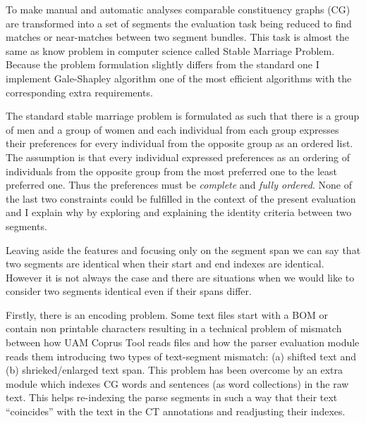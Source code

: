 To make manual and automatic analyses comparable constituency graphs (CG) are transformed into a set of segments the evaluation task being reduced to find matches or near-matches between two segment bundles. This task is almost the same as know problem in computer science called Stable Marriage Problem. Because the problem formulation slightly differs from the standard one I implement Gale-Shapley algorithm \citep{Gale1962} one of the most efficient algorithms with the corresponding extra requirements. 

The standard stable marriage problem is formulated as such that there is a group of men and a group of women and each individual from each group expresses their preferences for every individual from the opposite group as an ordered list. The assumption is that every individual expressed preferences as an ordering of individuals from the opposite group from the most preferred one to the least preferred one. Thus the preferences must be \textit{complete} and \textit{fully ordered}. None of the last two constraints could be fulfilled in the context of the present evaluation and I explain why by exploring and explaining the identity criteria between two segments. 

Leaving aside the features and focusing only on the segment span we can say that two segments are identical when their start and end indexes are identical. However it is not always the case and there are situations when we would like to consider two segments identical even if their spans differ. 

Firstly, there is an encoding problem. Some text files start with a BOM or contain non printable characters resulting in a technical problem of mismatch between how UAM Coprus Tool reads files and how the parser evaluation module reads them introducing two types of text-segment mismatch: (a) shifted text and (b) shrieked/enlarged text span. This problem has been overcome by an extra module which indexes CG words and sentences (as word collections) in the raw text. This helps re-indexing the parse segments in such a way that their text ``coincides'' with the text in the CT annotations and readjusting their indexes. 


